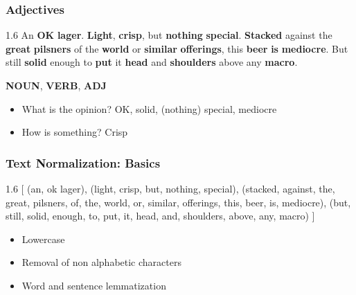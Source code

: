 \begin{frame}
    \frametitle{Adjectives}
\begin{spacing}{1.6}
    An \textbf{\textcolor{isegreen}{OK}} \textbf{\textcolor{isered}{lager}}. \textbf{\textcolor{isered}{Light}}, \textbf{\textcolor{isegreen}{crisp}}, but \textbf{\textcolor{isered}{nothing}} \textbf{\textcolor{isegreen}{special}}. \textbf{\textcolor{iseblue}{Stacked}} against the \textbf{\textcolor{isegreen}{great}} \textbf{\textcolor{isered}{pilsners}} of the \textbf{\textcolor{isered}{world}} or \textbf{\textcolor{isegreen}{similar}} \textbf{\textcolor{isered}{offerings}}, this \textbf{\textcolor{isered}{beer}} \textbf{\textcolor{iseblue}{is}} \textbf{\textcolor{isegreen}{mediocre}}. But still \textbf{\textcolor{isegreen}{solid}} enough to \textbf{\textcolor{iseblue}{put}} it \textbf{\textcolor{isered}{head}} and \textbf{\textcolor{isered}{shoulders}} above any \textbf{\textcolor{isered}{macro}}.
\end{spacing}

\vspace{-10pt}
\begin{flushright}
    \textbf{\textcolor{isered}{NOUN}}, \textbf{\textcolor{iseblue}{VERB}}, \textbf{\textcolor{isegreen}{ADJ}}
\end{flushright}

\begin{itemize}
\item What is the opinion? OK, solid, (nothing) special, mediocre
\item How is something? Crisp
\end{itemize}
\end{frame}

\begin{frame}
    \frametitle{Text Normalization: Basics}
\begin{spacing}{1.6}
    [ (an, ok lager), (light, crisp, but, nothing, special), (stacked, against, the, great, pilsners, of, the, world, or, similar, offerings, this, beer, is, mediocre), (but, still, solid, enough, to, put, it, head, and, shoulders, above, any, macro) ]
\end{spacing}
\vspace{10pt}
\begin{itemize}
\item Lowercase
\item Removal of non alphabetic characters
\item Word and sentence lemmatization
\end{itemize}
\end{frame}

